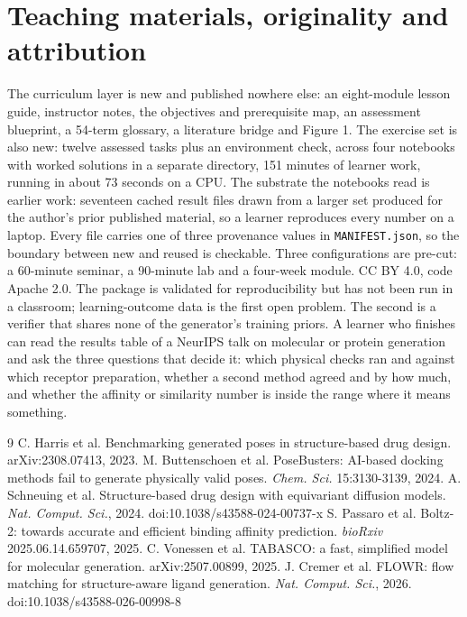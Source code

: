 \documentclass{article}
\begin{document}
\section{Teaching materials, originality and attribution}

The curriculum layer is new and published nowhere else: an eight-module lesson guide, instructor
notes, the objectives and prerequisite map, an assessment blueprint, a 54-term glossary, a literature
bridge and Figure 1. The exercise set is also new: twelve assessed tasks plus an environment check,
across four notebooks with worked solutions in a separate directory, 151 minutes of learner work,
running in about 73 seconds on a CPU. The substrate the notebooks read is earlier work:
seventeen cached result files drawn from a larger set produced for the author's prior published
material, so a learner reproduces every number on a laptop. Every file carries one of three provenance
values in \texttt{MANIFEST.json}, so the boundary between new and reused is checkable. Three
configurations are pre-cut: a 60-minute seminar, a 90-minute lab and a four-week module. CC BY 4.0,
code Apache 2.0. The package is validated for reproducibility but has not been run in a classroom; learning-outcome
data is the first open problem. The second is a verifier that shares none of the generator's training
priors. A learner who finishes can read
the results table of a NeurIPS talk on molecular or protein generation and ask the three questions
that decide it: which physical checks ran and against which receptor preparation, whether a second
method agreed and by how much, and whether the affinity or similarity number is inside the range where
it means something.


\footnotesize
\begin{thebibliography}{9}
\setlength{\itemsep}{0pt}\setlength{\parskip}{0pt}
 C. Harris et al. Benchmarking generated poses in structure-based drug design. arXiv:2308.07413, 2023.
 M. Buttenschoen et al. PoseBusters: AI-based docking methods fail to generate physically valid poses. \emph{Chem. Sci.} 15:3130-3139, 2024.
 A. Schneuing et al. Structure-based drug design with equivariant diffusion models. \emph{Nat. Comput. Sci.}, 2024. doi:10.1038/s43588-024-00737-x
 S. Passaro et al. Boltz-2: towards accurate and efficient binding affinity prediction. \emph{bioRxiv} 2025.06.14.659707, 2025.
 C. Vonessen et al. TABASCO: a fast, simplified model for molecular generation. arXiv:2507.00899, 2025.
 J. Cremer et al. FLOWR: flow matching for structure-aware ligand generation. \emph{Nat. Comput. Sci.}, 2026. doi:10.1038/s43588-026-00998-8
\end{thebibliography}
\end{document}

